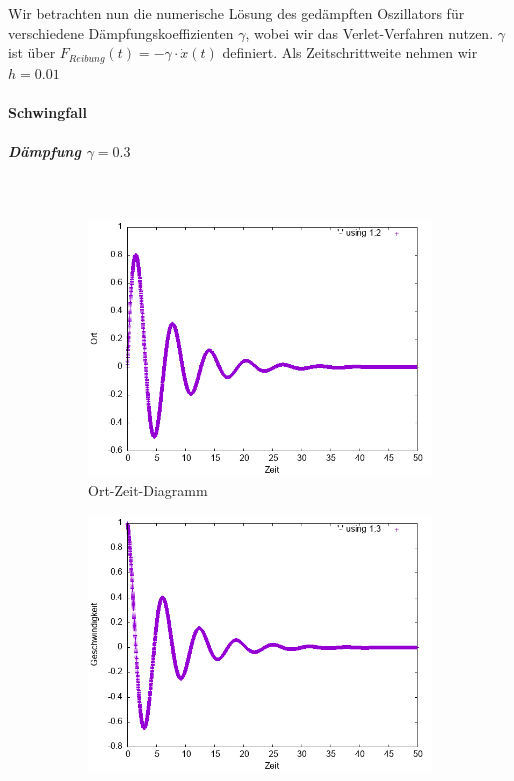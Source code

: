 \documentclass[
    oneside,
    ngerman,
    footinclude=false,
    captions=tableheading,
    DIV=12
]{scrartcl}
\begin{document}
        \subaufgabe{}
            Wir betrachten nun die numerische Lösung des gedämpften Oszillators für verschiedene Dämpfungskoeffizienten $\gamma$, wobei wir das Verlet-Verfahren nutzen. $\gamma$ ist über $F_{Reibung}(t)=-\gamma\cdot \dot x(t)$ definiert. Als Zeitschrittweite nehmen wir $h=0.01$

            \paragraph{Schwingfall}
                \subparagraph{Dämpfung $\gamma=0.3$}\,
                \begin{figure}[H]
                    \centering
                    \begin{subfigure}[b]{0.45\textwidth}
                        \centering
                        \includegraphics[width=\textwidth]{Bilddateien/VVA1(b)-001-0.3-x.png}
                        \caption{Ort-Zeit-Diagramm}
                        \label{fig:VVA1(a)-001-0.3-x}
                    \end{subfigure}
                    \hfill
                    \begin{subfigure}[b]{0.45\textwidth}
                        \centering
                        \includegraphics[width=\textwidth]{Bilddateien/VVA1(b)-001-0.3-v.png}

\end{subfigure}
\end{figure}
\end{document}
